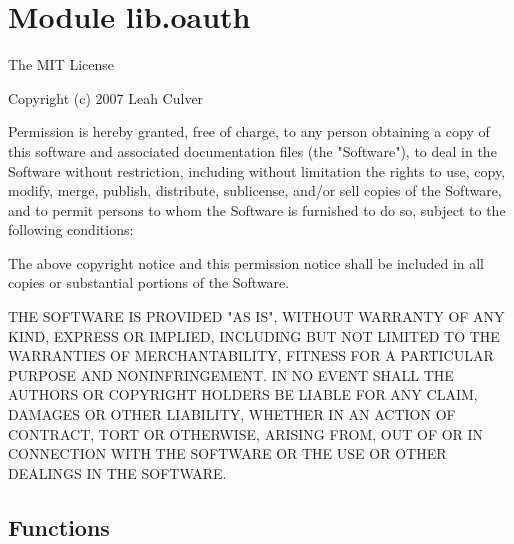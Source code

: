 %
%
%


\section{Module lib.oauth}

    \label{lib:oauth}
The MIT License

Copyright (c) 2007 Leah Culver

Permission is hereby granted, free of charge, to any person obtaining a 
copy of this software and associated documentation files (the "Software"), 
to deal in the Software without restriction, including without limitation 
the rights to use, copy, modify, merge, publish, distribute, sublicense, 
and/or sell copies of the Software, and to permit persons to whom the 
Software is furnished to do so, subject to the following conditions:

The above copyright notice and this permission notice shall be included in 
all copies or substantial portions of the Software.

THE SOFTWARE IS PROVIDED "AS IS", WITHOUT WARRANTY OF ANY KIND, EXPRESS OR 
IMPLIED, INCLUDING BUT NOT LIMITED TO THE WARRANTIES OF MERCHANTABILITY, 
FITNESS FOR A PARTICULAR PURPOSE AND NONINFRINGEMENT. IN NO EVENT SHALL THE
AUTHORS OR COPYRIGHT HOLDERS BE LIABLE FOR ANY CLAIM, DAMAGES OR OTHER 
LIABILITY, WHETHER IN AN ACTION OF CONTRACT, TORT OR OTHERWISE, ARISING 
FROM, OUT OF OR IN CONNECTION WITH THE SOFTWARE OR THE USE OR OTHER 
DEALINGS IN THE SOFTWARE.



  \subsection{Functions}

    \label{lib:oauth:build_authenticate_header}

